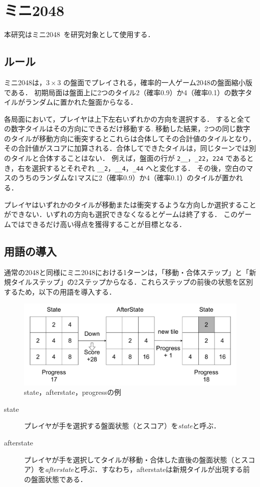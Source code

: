 \section{ミニ2048}
本研究はミニ2048~\cite{YaKN22J}を研究対象として使用する．

\subsection{ルール}

ミニ2048は，$3\times 3$ の盤面でプレイされる，確率的一人ゲーム{2048}の盤面縮小版である．
初期局面は盤面上に2つのタイル2（確率0.9）か4（確率0.1）の数字タイルがランダムに置かれた盤面からなる．

各局面において，プレイヤは上下左右いずれかの方向を選択する．
すると全ての数字タイルはその方向にできるだけ移動する.
移動した結果，2つの同じ数字のタイルが移動方向に衝突するとこれらは合体してその合計値のタイルとなり，
その合計値がスコアに加算される．合体してできたタイルは，同じターンでは別のタイルと合体することはない．
例えば，盤面の行が \verb*|2__|，\verb*|_22|，\verb*|224| であるとき，右を選択するとそれぞれ \verb*|__2|，\verb*|__4|，\verb*|_44| へと変化する．
その後，空白のマスのうちのランダムな1マスに2（確率0.9）か4（確率0.1）のタイルが置かれる．

プレイヤはいずれかのタイルが移動または衝突するような方向しか選択することができない．いずれの方向も選択できなくなるとゲームは終了する．
このゲームではできるだけ高い得点を獲得することが目標となる．

\subsection{用語の導入}
通常の2048と同様にミニ2048における1ターンは，「移動・合体ステップ」と「新規タイルステップ」の2ステップからなる．これらステップの前後の状態を区別するため，以下の用語を導入する．
\begin{figure}[t]
  \centering\includegraphics[width=.99\linewidth]{pdf/state_afterstate.drawio.pdf}
  \caption{state，afterstate，progressの例\cite{Terauchi25}}
  \label{afterstate}
 \end{figure}
\begin{description}
  \item[state] プレイヤが手を選択する盤面状態（とスコア）を\emph{state}と呼ぶ．
  \item[afterstate] プレイヤが手を選択してタイルが移動・合体した直後の盤面状態（とスコア）を\emph{afterstate}と呼ぶ．すなわち，afterstateは新規タイルが出現する前の盤面状態である．
 \end{description}


